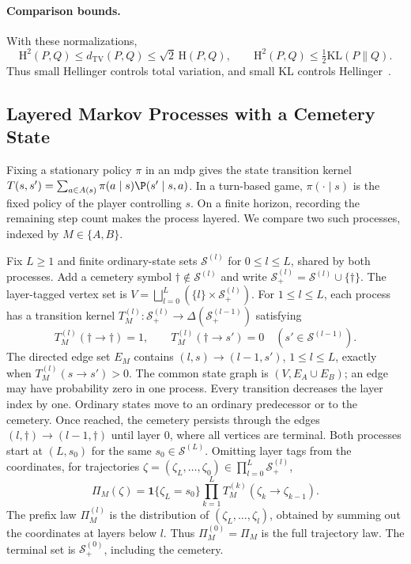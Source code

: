 \paragraph{Comparison bounds.}\label{ptnb:sec:lmp-hellinger-distance}\label{subsec:hellinger_definition}\label{ptnb:app:why-hellinger}
With these normalizations,
\[
 \mathrm H^2(P,Q)\le d_{\mathrm{TV}}(P,Q)\le\sqrt2\,\mathrm H(P,Q),
 \qquad \mathrm H^2(P,Q)\le\tfrac12\mathrm{KL}(P\|Q).
\]
Thus small Hellinger controls total variation, and small KL controls Hellinger~\parencite[Sections~7.3 and~7.6]{PolyanskiyWu2025InformationTheory}.


\subsection{Layered Markov Processes with a Cemetery State}\label{ptnb:sec:lmp-foundations}\label{subsec:trajectory_measures}\label{ptnb:sec:lmp}

Fixing a stationary policy $\pi$ in an \ac{mdp} gives the state transition kernel $T(s,s')=\sum_{a\in A(s)}\pi(a\mid s)\P(s'\mid s,a)$. In a turn-based game, $\pi(\cdot\mid s)$ is the fixed policy of the player controlling $s$. On a finite horizon, recording the remaining step count makes the process layered. We compare two such processes, indexed by $M\in\{A,B\}$.

Fix $L\ge1$ and finite ordinary-state sets $\mathcal S^{(l)}$ for $0\le l\le L$, shared by both processes. Add a cemetery symbol $\dagger\notin\mathcal S^{(l)}$ and write $\mathcal S^{(l)}_+=\mathcal S^{(l)}\cup\{\dagger\}$. The layer-tagged vertex set is $V=\bigsqcup_{l=0}^{L}(\{l\}\times\mathcal S^{(l)}_+)$. For $1\le l\le L$, each process has a transition kernel $T_M^{(l)}:\mathcal S^{(l)}_+\to\Delta(\mathcal S^{(l-1)}_+)$ satisfying
\begin{equation}\label{ptnb:eq:cemetery-absorbing}
 T_M^{(l)}(\dagger\to\dagger)=1,
 \qquad T_M^{(l)}(\dagger\to s')=0\quad(s'\in\mathcal S^{(l-1)}).
\end{equation}
The directed edge set $E_M$ contains $(l,s)\to(l-1,s')$, $1\le l\le L$, exactly when $T_M^{(l)}(s\to s')>0$. The common state graph is $(V,E_A\cup E_B)$; an edge may have probability zero in one process. Every transition decreases the layer index by one. Ordinary states move to an ordinary predecessor or to the cemetery. Once reached, the cemetery persists through the edges $(l,\dagger)\to(l-1,\dagger)$ until layer $0$, where all vertices are terminal. Both processes start at $(L,s_0)$ for the same $s_0\in\mathcal S^{(L)}$. Omitting layer tags from the coordinates, for trajectories $\zeta=(\zeta_L,\ldots,\zeta_0)\in\prod_{l=0}^L\mathcal S^{(l)}_+$,
\begin{equation}\label{ptnb:eq:path-measure}
 \Pi_M(\zeta)=\mathbf1\{\zeta_L=s_0\}\prod_{k=1}^L T_M^{(k)}(\zeta_k\to\zeta_{k-1}).
\end{equation}
The prefix law $\Pi_M^{(l)}$ is the distribution of $(\zeta_L,\ldots,\zeta_l)$, obtained by summing out the coordinates at layers below $l$. Thus $\Pi_M^{(0)}=\Pi_M$ is the full trajectory law. The terminal set is $\mathcal S_+^{(0)}$, including the cemetery.

